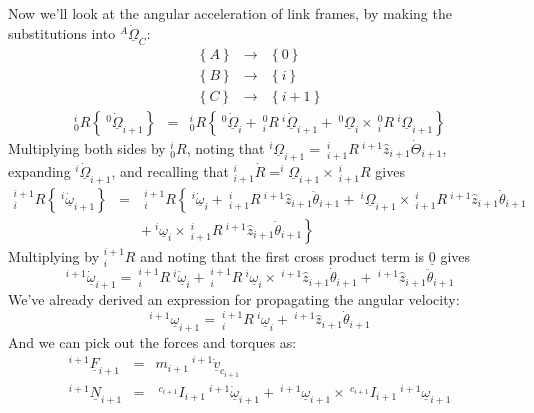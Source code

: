 \documentclass[fleqn]{article}
\begin{document}
Now we'll look at the angular acceleration of link frames, by making the substitutions into $^{A}\underline{\dot{\Omega}}_{C}$:
\begin{eqnarray}
	\left\{ A \right\} & \rightarrow & \left\{ 0 \right\} \nonumber \\
	\left\{ B \right\} & \rightarrow & \left\{ i \right\} \nonumber \\
	\left\{ C \right\} & \rightarrow & \left\{ i+1 \right \} \nonumber
\end{eqnarray}
\begin{eqnarray}
^{i}_{0}R\left\{\ ^{0}\underline{\dot{\Omega}}_{i+1}\right\} & = & ^{i}_{0}R\left\{\ ^{0}\underline{\dot{\Omega}}_{i}+\ ^{0}_{i}R\ ^{i}\underline{\dot{\Omega}}_{i+1}+\ ^{0}\underline{\Omega}_{i}\times\ ^{0}_{i}R\ ^{i}\underline{\Omega}_{i+1}\right\} \nonumber
\end{eqnarray}
Multiplying both sides by $^{i}_{0}R$, noting that $^{i}\underline{\Omega}_{i+1} = \ ^{i}_{i+1}R\ ^{i+1}\hat{z}_{i+1}\dot{\Theta}_{i+1}$, expanding $^{i}\dot{\underline{\Omega}}_{i+1}$, and recalling that $^{i}_{i+1}\dot{R} = ^{i}\underline{\Omega}_{i+1}\times \ ^{i}_{i+1}R$ gives
\begin{eqnarray}
^{i+1}_{i}R\left\{\ ^{i}\underline{\dot{\omega}}_{i+1}\right\} & = & \ ^{i+1}_{i}R\left\{\ ^{i}\underline{\dot{\omega}}_{i} + \ ^{i}_{i+1}R\ ^{i+1}\hat{z}_{i+1}\ddot{\theta}_{i+1} + \ ^{i}\underline{\Omega}_{i+1}\!\times\ \!^{i}_{i+1}R\ ^{i+1}\hat{z}_{i+1}\dot{\theta}_{i+1} \right. \nonumber \\
&& + \left. \ ^{i}\underline{\omega}_{i}\times\ ^{i}_{i+1}R\ ^{i+1}\hat{z}_{i+1}\dot{\theta}_{i+1}\right\} \nonumber
\end{eqnarray}
Multiplying by $^{i+1}_{i}R$ and noting that the first cross product term is $\underline{0}$ gives
\begin{equation}
	^{i+1}\underline{\dot{\omega}}_{i+1} = \ ^{i+1}_{i}R\ ^{i}\dot{\underline{\omega}}_{i}+\ ^{i+1}_{i}R\ ^{i}\underline{\omega}_{i}\times\ ^{i+1}\hat{z}_{i+1}\dot{\theta}_{i+1}+\ ^{i+1}\hat{z}_{i+1}\ddot{\theta}_{i+1}
\end{equation}
We've already derived an expression for propagating the angular velocity:
\begin{equation}
	^{i+1}\underline{\omega}_{i+1} = \ ^{i+1}_{i}R\ ^{i}\underline{\omega}_{i} + \ ^{i+1}\hat{z}_{i+1}\dot{\theta}_{i+1}
\end{equation}
And we can pick out the forces and torques as:
\begin{eqnarray}
	^{i+1}\underline{F}_{i+1} & = & m_{i+1}\ ^{i+1}\underline{\dot{v}}_{c_{i+1}} \nonumber \\
	^{i+1}\underline{N}_{i+1} & = & \ ^{c_{i+1}}I_{i+1} \ ^{i+1}\underline{\dot{\omega}}_{i+1} + \ ^{i+1}\underline{\omega}_{i+1}\times \ ^{c_{i+1}}I_{i+1}\ ^{i+1}\underline{\omega}_{i+1} \nonumber
\end{eqnarray}
\end{document}
